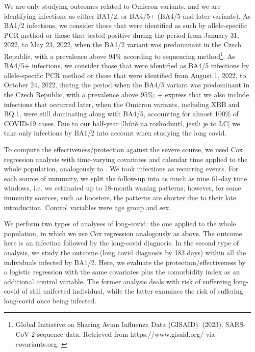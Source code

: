 \documentclass[sn-basic]{sn-jnl}%
\theoremstyle{thmstyleone}%
\theoremstyle{thmstyletwo}%
\theoremstyle{thmstylethree}%
\begin{document}
We are only studying outcomes related to Omicron variants, and we are identifying infections as either BA1/2, or BA4/5+ (BA4/5 and later variants). As BA1/2 infections, we consider those that were identified as such by allele-specific PCR method or those that tested positive during the period from January 31, 2022, to May 23, 2022, when the BA1/2 variant was predominant in the Czech Republic, with a prevalence above 94\% according to sequencing method\footnote{Global Initiative on Sharing Avian Influenza Data (GISAID). (2023). SARS-CoV-2 sequence data. Retrieved from https://www.gisaid.org/ via covariants.org. \label{fnlabel}}. As BA4/5+ infections, we consider those that were identified as BA4/5 infections by allele-specific PCR method or those that were identified from August 1, 2022, to October 24, 2022, during the period when the BA4/5 variant was predominant in the Czech Republic, with a prevalence above 95\%; + express that we also include infections that occurred later, when the Omicron variants, including XBB and BQ.1, were still dominating along with BA4/5, accounting for almost 100\% of COVID-19 cases.
Due to our half-year [lhůtě na rozhodnutí, jestli je to LC] we take only infections by BA1/2 into account when studying the long covid.

To compute the effectiveness/protection against the severe course,  we used Cox regression analysis with time-varying covariates and calendar time applied to the whole population, analogously to \cite{smid2022protection}. We took infections as recurring events. For each source of immunity, we split the follow-up into as much as nine 61-day time windows, i.e. we estimated up to 18-month waning patterns; however, for some immunity sources, such as boosters, the patterns are shorter due to their late introduction. Control variables were age group and sex.

We perform two types of analyses of long-covid: the one applied to the whole population, in which we use Cox regression analogously as above. The outcome here is an infection followed by the long-covid diagnosis. In the second type of analysis, we study the outcome (long covid diagnosis by 183 days) within all the individuals infected by BA1/2. Here, we evaluate the protection/effectiveness by a logistic regression with the same covariates plus the comorbidity index as an additional control variable. The former analysis deals with risk of suffereing long-covid of still unifected individual, while the latter examines the risk of suffering long-covid once being infected.
\end{document}
